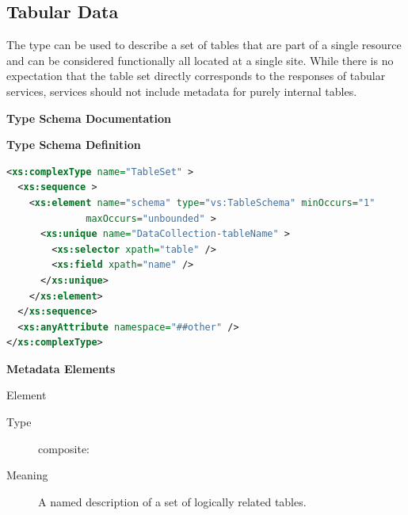 \documentclass[11pt,a4paper]{ivoa}
\begin{document}



\subsection{Tabular Data}
\label{sect:table}


The  type can be used
to describe a set of tables that are part of a single resource and can
be considered functionally all located at a single site.  While there is
no expectation that the table set directly corresponds to the responses
of tabular services,
services should not include metadata for purely internal
tables.



\begin{generated}
\begingroup
      	\renewcommand*\descriptionlabel[1]{%
      	\hbox to 5.5em{\emph{#1}\hfil}}\vspace{2ex}\noindent\textbf{ Type Schema Documentation}


\vspace{1ex}\noindent\textbf{ Type Schema Definition}

\begin{lstlisting}[language=XML,basicstyle=\footnotesize]
<xs:complexType name="TableSet" >
  <xs:sequence >
    <xs:element name="schema" type="vs:TableSchema" minOccurs="1"
              maxOccurs="unbounded" >
      <xs:unique name="DataCollection-tableName" >
        <xs:selector xpath="table" />
        <xs:field xpath="name" />
      </xs:unique>
    </xs:element>
  </xs:sequence>
  <xs:anyAttribute namespace="##other" />
</xs:complexType>
\end{lstlisting}

\vspace{0.5ex}\noindent\textbf{ Metadata Elements}

\begingroup\small\begin{bigdescription}\item[Element \xmlel{schema}]
\begin{description}
\item[Type] composite: 
\item[Meaning] 
                A named description of a set of logically related tables.
              

\end{description}
\end{bigdescription}
\end{generated}
\end{document}
